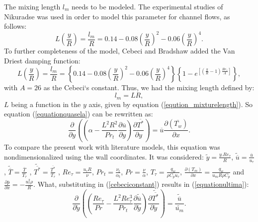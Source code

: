 \documentclass[10pt]{article} %
\begin{document}
The mixing length $ l_m $ needs to be modeled. The experimental studies of Nikuradse was used in order to model this parameter for channel flows, as follows:
\begin{equation}
L\left(\frac{y}{R}\right) = \frac{l_m}{R} = 0.14 - 0.08 \left(\frac{y}{R}\right)^2 - 0.06\left(\frac{y}{R}\right)^4.
\end{equation}
To further completeness of the model, Cebeci and Bradshaw added the Van Driest damping function:
\begin{equation}\label{eqution_mixturelength}
L\left(\frac{y}{R}\right)  = \frac{l_m}{R} = \left\{ 0.14 - 0.08 \left(\frac{y}{R}\right)^2 - 0.06\left(\frac{y}{R}\right)^4\right\}\left\{  1 - e^{[(\frac{y}{R} - 1) \frac{Re_\tau}{A}]}\right\},
\end{equation}
with $A = 26$ as the Cebeci`s constant. Thus, we had the mixing length defined by:
\begin{equation}
l_m = L R,
\end{equation}
$ L $ being a function in the $ y $ axis, given by equation (\ref{eqution_mixturelength}). So equation (\ref{equationquasela}) can be rewritten as:
\begin{equation}\label{cebeciconstant}
{\frac{\partial{}}{\partial{y}}} \left( \left( \alpha   
- \frac{{L}^2 R ^2}{Pr_t}\frac{\partial \overline{u}}{\partial y} \right) \frac{\partial \overline{T^\ast}}{\partial y} \right)
= 
\overline{u}\frac{\partial{}\left(\overline{T_w}\right)  }{\partial{x}}.
\end{equation}
 To compare the present work with literature models, this equation was nondimensionalized using the wall coordinates. It was considered: $ \tilde{y} = \frac{y . Re_\tau}{R} $, $ \tilde{\overline{u}} = \frac{\overline{u}}{u_\tau} $ , $ \tilde{\overline{T}} = \frac{\overline{T}}{T_\tau} $ , $ \tilde{\overline{T^\ast}} = \frac{\overline{T^\ast}}{T_\tau} $ , $Re_\tau = \frac{u_\tau R}{\nu}$, $Pr_t = \frac{\nu_t}{\alpha_t}$, $Pr = \frac{\nu}{\alpha}$, $T_\tau = \frac{q_w}{\rho C_p u_\tau}$, $\frac{\partial{\left(T_m\right)}}{\partial{x}} = \frac{q_w}{u_m  R \rho  C_p } $ and $\frac{\partial \overline{p}}{\partial x} = - \frac{u_\tau^2 \rho}{R} $. What, substituting in (\ref{cebeciconstant}) results in (\ref{equationultima}):
\\
\begin{equation}\label{equationultima}
{\frac{\partial{}}{\partial{\tilde{y}}}} \left( \left( \frac{Re_\tau}{Pr}   
- \frac{{L}^2 Re_\tau ^3}{Pr_t}\frac{\partial \tilde{\overline{u}}}{\partial \tilde{y}} \right) \frac{\partial \tilde{\overline{T^\ast}}}{\partial \tilde{y}} \right)
= 
\frac{\tilde{\overline{u}}}{\tilde{u_m}}.
\end{equation}
\end{document}
